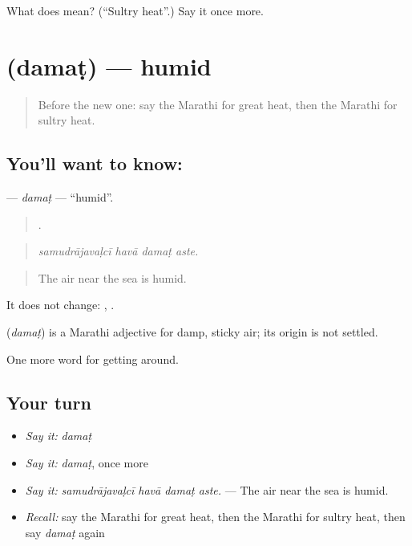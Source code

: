 \begin{tcolorbox}[breakable,colback=teal!4,colframe=teal!35!black,title={Before you move on}]
What does  mean? (\textquotedblleft{}Sultry heat\textquotedblright{}.) Say it once more.
\end{tcolorbox}
\section[\texorpdfstring{\mr{दमट} (damaṭ)}{दमट (damaṭ)}]{ (damaṭ) — humid}

\label{lesson:MR-C436-damat}



\begin{quote}
Before the new one: say the Marathi for great heat, then the Marathi for sultry heat.
\end{quote}

\subsection*{You'll want to know: }
\textbf{} — \emph{damaṭ} — \textquotedblleft{}humid\textquotedblright{}.

\begin{quote}
   .
\end{quote}

\begin{quote}
\emph{samudrājavaḷcī havā damaṭ aste.}
\end{quote}

\begin{quote}
The air near the sea is humid.
\end{quote}

It does not change:  ,  .

\begin{cousinweb}
\textbf{} (\emph{damaṭ}) is a Marathi adjective for damp, sticky air; its origin is not settled.
\end{cousinweb}

\begin{grammarlens}[title={What you've built}]
One more word for getting around.
\end{grammarlens}

\subsection*{Your turn}
\begin{itemize}
\raggedright
  \item \emph{Say it:} \emph{damaṭ}
  \item \emph{Say it:} \emph{damaṭ}, once more
  \item \emph{Say it:} \emph{samudrājavaḷcī havā damaṭ aste.} — The air near the sea is humid.
  \item \emph{Recall:} say the Marathi for great heat, then the Marathi for sultry heat, then say \emph{damaṭ} again
\end{itemize}

